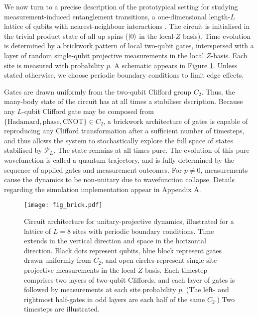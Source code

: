 \documentclass[10pt]{article}
\begin{document}
We now turn to a precise description of the prototypical setting for studying measurement-induced entanglement transitions, a one-dimensional length-$L$ lattice of qubits with nearest-neighbour interactions \cite{chan2019unitary, skinner2019measurement, li2018quantum}. The circuit is initialised in the trivial product state of all up spins ($\ket{0}$ in the local-$Z$ basis). Time evolution is determined by a brickwork pattern of local two-qubit gates, interspersed with a layer of random single-qubit projective measurements in the local $Z$-basis. Each site is measured with probability $p$. A schematic appears in Figure \ref{fig_brick}. Unless stated otherwise, we choose periodic boundary conditions to limit edge effects.

Gates are drawn uniformly from the two-qubit Clifford group $C_2$. Thus, the many-body state of the circuit has at all times a stabiliser dscription. Because any $L$-qubit Clifford gate may be composed from $\{\text{Hadamard}, \text{phase}, \text{CNOT}\} \in C_2$, a brickwork architecture of gates is capable of reproducing any Clifford transformation after a sufficient number of timesteps, and thus allows the system to stochastically explore the full space of states stabilised by $\mathcal{P}_L$. The state remains at all times pure. The evolution of this pure wavefunction is called a quantum trajectory, and is fully determined by the sequence of applied gates and measurement outcomes. For $p\neq0$, measurements cause the dynamics to be non-unitary due to wavefunction collapse. Details regarding the simulation implementation appear in Appendix A.

\begin{figure}
\centering
\texttt{[image: fig\_brick.pdf]}
\caption{Circuit architecture for unitary-projective dynamics, illustrated for a lattice of $L=8$ sites with periodic boundary conditions. Time extends in the vertical direction and space in the horizontal direction. Black dots represent qubits, blue block represent gates drawn uniformly from $C_2$, and open circles represent single-site projective measurements in the local $Z$ basis. Each timestep comprises two layers of two-qubit Cliffords, and each layer of gates is followed by measurements at each site probability $p$. (The left- and rightmost half-gates in odd layers are each half of the same $C_2$.) Two timesteps are illustrated.}
\label{fig_brick}
\end{figure}
\end{document}
